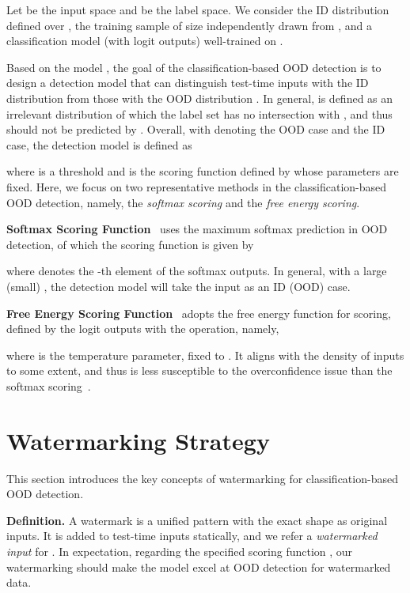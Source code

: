 \documentclass{article}
\begin{document}
Let  be the input space and  be the label space. We consider the ID distribution  defined over , the training sample  of size  independently drawn from , and a classification model  (with logit outputs) well-trained on . 

Based on the model , the goal of the classification-based OOD detection is to design a detection model  that can distinguish test-time inputs 
with the ID distribution  from those with the OOD distribution . In general,  is defined as an irrelevant distribution of which the label set has no intersection with , and thus should not be predicted by . 
Overall, with  denoting the OOD case and  the ID case, the detection model  is defined as 

where  is a threshold and  is the scoring function defined by  whose parameters are fixed. Here, we focus on two representative methods in the classification-based OOD detection, namely, the \emph{softmax scoring} and the \emph{free energy scoring}. 

\textbf{Softmax Scoring Function}~\cite{hendrycks2016baseline} uses the maximum softmax prediction in OOD detection, of which the scoring function  is given by

where  denotes the -th element of the softmax outputs. In general, with a large (small) , the detection model will take the input  as an ID (OOD) case. 

\textbf{Free Energy Scoring Function}~\cite{liu2020energy} adopts the free energy function for scoring, defined by the logit outputs with the  operation, namely,

where  is the temperature parameter, fixed to  \cite{liu2020energy}. It aligns with the density of inputs to some extent, and thus is less susceptible to the overconfidence issue than the softmax scoring~\cite{liu2020energy}. 

\section{Watermarking Strategy}
\label{sec: heuristic}

This section introduces the key concepts of watermarking for classification-based OOD detection.

\textbf{Definition.} A watermark  is a unified pattern with the exact shape as original inputs. It is added to test-time inputs statically, and we refer  a \emph{watermarked input} for . In expectation, regarding the specified scoring function , our watermarking should make the model excel at OOD detection for watermarked data. 
\end{document}
